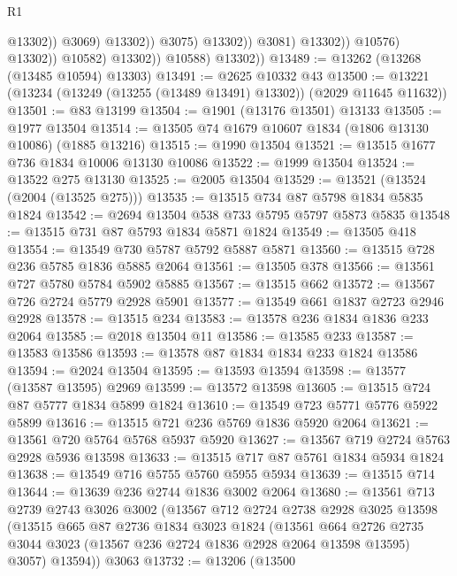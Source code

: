 \begin{lexlean}{R1}
\begin{coremodule}
                                            @13302))
                                        @3069)
                                      @13302))
                                  @3075)
                                @13302))
                            @3081)
                          @13302))
                      @10576)
                    @13302))
                @10582)
              @13302))
          @10588)
        @13302))
@13489 := @13262 (@13268 (@13485 @10594) @13303)
@13491 := @2625 @10332 @43
@13500 := @13221 (@13234 (@13249 (@13255 (@13489 @13491) @13302)) (@2029 @11645 @11632))
@13501 := @83 @13199
@13504 := @1901 (@13176 @13501) @13133
@13505 := @1977 @13504
@13514 := @13505 @74 @1679 @10607 @1834 (@1806 @13130 @10086) (@1885 @13216)
@13515 := @1990 @13504
@13521 := @13515 @1677 @736 @1834 @10006 @13130 @10086
@13522 := @1999 @13504
@13524 := @13522 @275 @13130
@13525 := @2005 @13504
@13529 := @13521 (@13524 (@2004 (@13525 @275)))
@13535 := @13515 @734 @87 @5798 @1834 @5835 @1824
@13542 := @2694 @13504 @538 @733 @5795 @5797 @5873 @5835
@13548 := @13515 @731 @87 @5793 @1834 @5871 @1824
@13549 := @13505 @418
@13554 := @13549 @730 @5787 @5792 @5887 @5871
@13560 := @13515 @728 @236 @5785 @1836 @5885 @2064
@13561 := @13505 @378
@13566 := @13561 @727 @5780 @5784 @5902 @5885
@13567 := @13515 @662
@13572 := @13567 @726 @2724 @5779 @2928 @5901
@13577 := @13549 @661 @1837 @2723 @2946 @2928
@13578 := @13515 @234
@13583 := @13578 @236 @1834 @1836 @233 @2064
@13585 := @2018 @13504 @11
@13586 := @13585 @233
@13587 := @13583 @13586
@13593 := @13578 @87 @1834 @1834 @233 @1824 @13586
@13594 := @2024 @13504
@13595 := @13593 @13594
@13598 := @13577 (@13587 @13595) @2969
@13599 := @13572 @13598
@13605 := @13515 @724 @87 @5777 @1834 @5899 @1824
@13610 := @13549 @723 @5771 @5776 @5922 @5899
@13616 := @13515 @721 @236 @5769 @1836 @5920 @2064
@13621 := @13561 @720 @5764 @5768 @5937 @5920
@13627 := @13567 @719 @2724 @5763 @2928 @5936 @13598
@13633 := @13515 @717 @87 @5761 @1834 @5934 @1824
@13638 := @13549 @716 @5755 @5760 @5955 @5934
@13639 := @13515 @714
@13644 := @13639 @236 @2744 @1836 @3002 @2064
@13680 := @13561
    @713
    @2739
    @2743
    @3026
    @3002
    (@13567
      @712
      @2724
      @2738
      @2928
      @3025
      @13598
      (@13515
        @665
        @87
        @2736
        @1834
        @3023
        @1824
        (@13561
          @664
          @2726
          @2735
          @3044
          @3023
          (@13567 @236 @2724 @1836 @2928 @2064 @13598 @13595)
          @3057)
        @13594))
    @3063
@13732 := @13206
    (@13500

\end{coremodule}
\end{lexlean}
